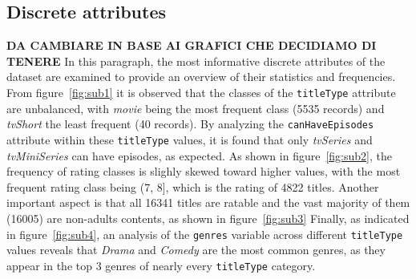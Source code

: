 \subsection{Discrete attributes}
\textbf{DA CAMBIARE IN BASE AI GRAFICI CHE DECIDIAMO DI TENERE}
In this paragraph, the most informative discrete attributes of the dataset are examined to provide an overview of their statistics and frequencies. \\
From figure~\ref{fig:sub1} it is observed that the classes of the \texttt{titleType} attribute are unbalanced, with \textit{movie} being 
the most frequent class (5535 records) and \textit{tvShort} the least frequent (40 records). 
By analyzing the \texttt{canHaveEpisodes} attribute within these \texttt{titleType} values, it is found that only \textit{tvSeries} and 
\textit{tvMiniSeries} can have episodes, as expected.
As shown in figure~\ref{fig:sub2}, the frequency of rating classes is slighly skewed toward higher values, with the most frequent rating 
class being (7, 8], which is the rating of 4822 titles.
Another important aspect is that all 16341 titles are ratable and the vast majority of them (16005) are non-adults contents, as shown 
in figure~\ref{fig:sub3}
Finally, as indicated in figure~\ref{fig:sub4}, an analysis of the \texttt{genres} variable across different \texttt{titleType} values 
reveals that \textit{Drama} and \textit{Comedy} are the most common genres, as they appear in the top 3 genres of nearly every \texttt{titleType} category.


